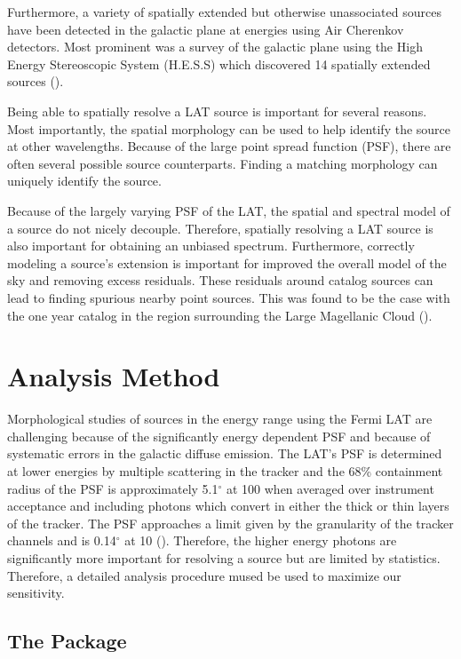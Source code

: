 \documentclass[12pt,preprint]{aastex}
\newcommand{\mev}{\text{MeV}\xspace}
\newcommand{\gev}{\text{GeV}\xspace}
\newcommand{\tev}{\text{TeV}\xspace}
\renewcommand{\deg}{\ensuremath{^\circ}\xspace}
\newcommand{\pointlike}{\text{\em pointlike}\xspace}
\begin{document}
Furthermore, a variety of spatially extended but otherwise unassociated
sources have been detected in the galactic plane at \tev energies using
Air Cherenkov detectors. Most prominent was a survey of the galactic plane
using the High Energy Stereoscopic System (H.E.S.S) which discovered 14
spatially extended sources (\cite{HESS_plane_survey}).

Being able to spatially resolve a LAT source is important for several
reasons. Most importantly, the spatial morphology can be used to
help identify the source at other wavelengths. Because of the large
point spread function (PSF), there are often several possible source
counterparts.  Finding a matching morphology can uniquely identify
the source.

Because of the largely varying PSF of the LAT, the spatial and spectral
model of a source do not nicely decouple. Therefore, spatially resolving
a LAT source is also important for obtaining an unbiased spectrum.
Furthermore, correctly modeling a source's extension is important for
improved the overall model of the sky and removing excess residuals.
These residuals around catalog sources can lead to finding spurious nearby
point sources. This was found to be the case with the one year catalog
in the region surrounding the Large Magellanic Cloud (\cite{first_cat}).


\section{Analysis Method}

Morphological studies of sources in the \gev energy range
using the Fermi LAT are challenging because of the significantly energy
dependent PSF and because of systematic errors in the galactic diffuse
emission.  The LAT's PSF is determined at lower energies by multiple
scattering in the tracker and the 68\% containment radius of the PSF is
approximately 5.1\deg at 100 \mev  when averaged over instrument acceptance
and including photons which convert in either the thick or thin layers of
the tracker. The PSF approaches a limit given by the granularity of the
tracker channels and is 0.14\deg at 10 \gev (\cite{on_orbit_calibration}).
Therefore, the higher energy photons are significantly more important for
resolving a source but are limited by statistics. Therefore,
a detailed analysis procedure mused be used to maximize our
sensitivity.

\subsection{The \pointlike Package}
\end{document}
